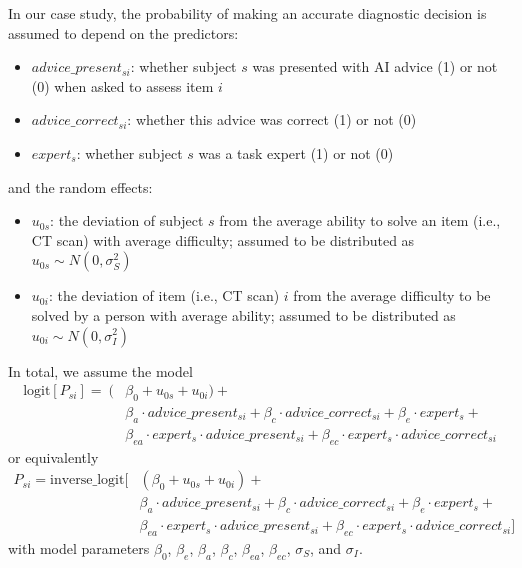 \documentclass[
  man,
  floatsintext,
  longtable,
  a4paper,
  nolmodern,
  notxfonts,
  notimes,
  colorlinks=true,linkcolor=blue,citecolor=blue,urlcolor=blue]{apa7}
\providecommand{\tightlist}{%
  \setlength{\itemsep}{0pt}\setlength{\parskip}{0pt}}
\begin{document}
In our case study, the probability of making an accurate diagnostic
decision is assumed to depend on the predictors:

\begin{itemize}
\tightlist
\item
  \(advice\_present_{si}\): whether subject \(s\) was presented with AI
  advice (1) or not (0) when asked to assess item \(i\)
\item
  \(advice\_correct_{si}\): whether this advice was correct (1) or not
  (0)
\item
  \(expert_s\): whether subject \(s\) was a task expert (1) or not (0)
\end{itemize}

and the random effects:

\begin{itemize}
\tightlist
\item
  \(u_{0s}\): the deviation of subject \(s\) from the average ability to
  solve an item (i.e., CT scan) with average difficulty; assumed to be
  distributed as \(u_{0s} \sim N(0, \sigma_S^2)\)
\item
  \(u_{0i}\): the deviation of item (i.e., CT scan) \(i\) from the
  average difficulty to be solved by a person with average ability;
  assumed to be distributed as \(u_{0i} \sim N(0, \sigma_I^2)\)
\end{itemize}

In total, we assume the model \[
\begin{aligned}
\text{logit}[P_{si}] =\ (&\beta_0 + u_{0s} + u_{0i}) + \\
&\beta_a \cdot advice\_present_{si} + \beta_c \cdot advice\_correct_{si} + \beta_e \cdot expert_s + \\
&\beta_{ea} \cdot expert_{s} \cdot advice\_present_{si} + \beta_{ec} \cdot expert_{s} \cdot advice\_correct_{si}
\end{aligned}
\] or equivalently \[
\begin{aligned}
P_{si} = \text{inverse\_logit}[&(\beta_0 + u_{0s} + u_{0i}) + \\
&\beta_a \cdot advice\_present_{si} + \beta_c \cdot advice\_correct_{si} + \beta_e \cdot expert_s + \\
&\beta_{ea} \cdot expert_{s} \cdot advice\_present_{si} + \beta_{ec} \cdot expert_{s} \cdot advice\_correct_{si}]
\end{aligned}
\] with model parameters \(\beta_0\), \(\beta_e\), \(\beta_a\),
\(\beta_c\), \(\beta_{ea}\), \(\beta_{ec}\), \(\sigma_S\), and
\(\sigma_I\).
\end{document}
